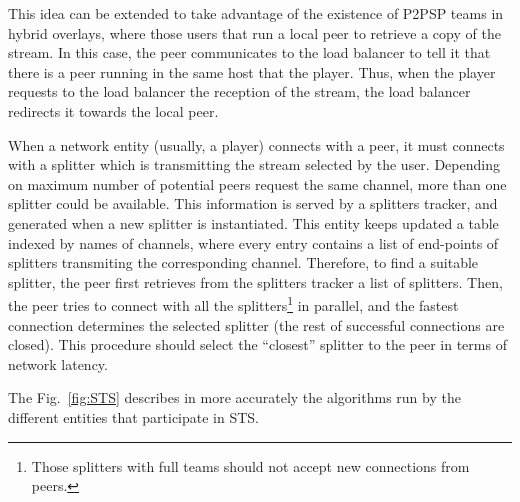 This idea can be extended to take advantage of the existence of P2PSP
teams in hybrid overlays, where those users that run a local peer
to retrieve a copy of the stream. In this case, the peer communicates
to the load balancer to tell it that there is a peer running in the
same host that the player. Thus, when the player requests to the load
balancer the reception of the stream, the load balancer redirects it
towards the local peer.

When a network entity (usually, a player) connects with a peer, it
must connects with a splitter which is transmitting the stream
selected by the user. Depending on maximum number of potential peers
request the same channel, more than one splitter could be
available. This information is served by a splitters tracker, and
generated when a new splitter is instantiated. This entity keeps updated a
table indexed by names of channels, where every entry contains a list
of end-points of splitters transmiting the corresponding
channel. Therefore, to find a suitable splitter, the peer first
retrieves from the splitters tracker a list of splitters. Then, the
peer tries to connect with all the splitters\footnote{Those splitters
with full teams should not accept new connections from peers.} in
parallel, and the fastest connection determines the selected splitter
(the rest of successful connections are closed). This procedure should
select the ``closest'' splitter to the peer in terms of network
latency.

\begin{figure*}
   \caption{Procedures run by the load balancer,
    the splitters tracker, the splitters and the peers. By definition,
    tasks (infinite loops) and threads (finite loops) are run in
    parallel with other tasks, threads and functions. \label{fig:STS}}
\end{figure*}

The Fig.~\ref{fig:STS} describes in more accurately the algorithms run
by the different entities that participate in STS.

